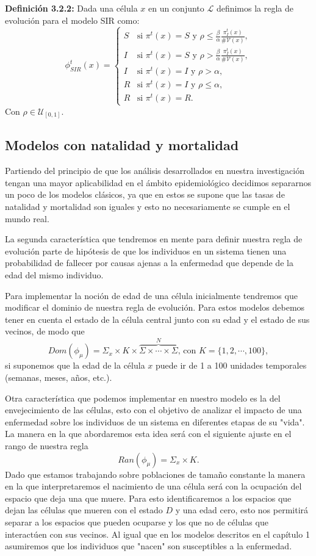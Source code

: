 \textbf{Definición 3.2.2:} Dada una célula $x$ en un conjunto $\mathcal{L}$ definimos la regla de evolución para el modelo SIR como:
\begin{equation}
    \phi_{SIR}^t(x)=\left\{\begin{array}{ll}
        S & \text{si }\pi^t(x)=S\text{ y }\rho\leq\frac{\beta}{\alpha}\frac{\pi_I^t(x)}{\#\mathcal{V}(x)}, \\
        I & \text{si }\pi^t(x)=S\text{ y }\rho>\frac{\beta}{\alpha}\frac{\pi_I^t(x)}{\#\mathcal{V}(x)}, \\
        I & \text{si }\pi^t(x)=I\text{ y }\rho>\alpha,\\
        R & \text{si }\pi^t(x)=I\text{ y }\rho\leq\alpha, \\
        R & \text{si }\pi^t(x)=R.
    \end{array}\right.
\end{equation}
Con $\rho\in\mathcal{U}_{[0,1]}$.
\subsection{Modelos con natalidad y mortalidad}
Partiendo del principio de que los análisis desarrollados en nuestra investigación tengan una mayor aplicabilidad en el ámbito epidemiológico decidimos separarnos un poco de los modelos clásicos, ya que en estos se supone que las tasas de natalidad y mortalidad son iguales y esto no necesariamente se cumple en el mundo real.

La segunda característica que tendremos en mente para definir nuestra regla de evolución parte de hipótesis de que los individuos en un sistema tienen una probabilidad de fallecer por causas ajenas a la enfermedad que depende de la edad del mismo individuo.

Para implementar la noción de edad de una célula inicialmente tendremos que modificar el dominio de nuestra regla de evolución. Para estos modelos debemos tener en cuenta el estado de la célula central junto con su edad y el estado de sus vecinos, de modo que 
$$Dom(\phi_\mu)=\Sigma_x\times K\times\overbrace{\Sigma\times\cdots\times\Sigma}^N\text{, con }K=\{1,2,\cdots,100\},$$
si suponemos que la edad de la célula $x$ puede ir de 1 a 100 unidades temporales (semanas, meses, años, etc.).

Otra característica que podemos implementar en nuestro modelo es la del envejecimiento de las células, esto con el objetivo de analizar el impacto de una enfermedad sobre los individuos de un sistema en diferentes etapas de su "vida". La manera en la que abordaremos esta idea será con el siguiente ajuste en el rango de nuestra regla
$$Ran(\phi_\mu)=\Sigma_x\times K.$$
Dado que estamos trabajando sobre poblaciones de tamaño constante la manera en la que interpretaremos el nacimiento de una célula será con la ocupación del espacio que deja una que muere. Para esto identificaremos a los espacios que dejan las células que mueren con el estado $D$ y una edad cero, esto nos permitirá separar a los espacios que pueden ocuparse y los que no de células que interactúen con sus vecinos. Al igual que en los modelos descritos en el capítulo 1 asumiremos que los individuos que "nacen" son susceptibles a la enfermedad.

